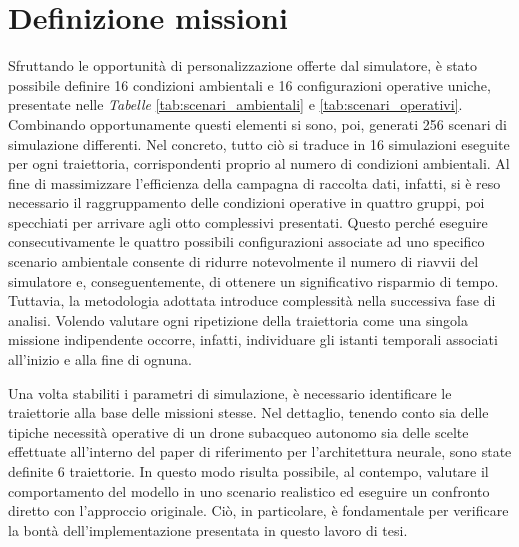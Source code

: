 \section{Definizione missioni}

Sfruttando le opportunità di personalizzazione offerte dal simulatore, è stato possibile definire 16 condizioni ambientali e 16 configurazioni operative uniche, presentate nelle \emph{Tabelle} \ref{tab:scenari_ambientali} e \ref{tab:scenari_operativi}. Combinando opportunamente questi elementi si sono, poi, generati 256 scenari di simulazione differenti. Nel concreto, tutto ciò si traduce in 16 simulazioni eseguite per ogni traiettoria, corrispondenti proprio al numero di condizioni ambientali. Al fine di massimizzare l'efficienza della campagna di raccolta dati, infatti, si è reso necessario il raggruppamento delle condizioni operative in quattro gruppi, poi specchiati per arrivare agli otto complessivi presentati. Questo perché eseguire consecutivamente le quattro possibili configurazioni associate ad uno specifico scenario ambientale consente di ridurre notevolmente il numero di riavvii del simulatore e, conseguentemente, di ottenere un significativo risparmio di tempo. Tuttavia, la metodologia adottata introduce complessità nella successiva fase di analisi. Volendo valutare ogni ripetizione della traiettoria come una singola missione indipendente occorre, infatti, individuare gli istanti temporali associati all'inizio e alla fine di ognuna.  

Una volta stabiliti i parametri di simulazione, è necessario identificare le traiettorie alla base delle missioni stesse. Nel dettaglio, tenendo conto sia delle tipiche necessità operative di un drone subacqueo autonomo sia delle scelte effettuate all'interno del paper di riferimento per l'architettura neurale\cite{NavNet}, sono state definite 6 traiettorie. In questo modo risulta possibile, al contempo, valutare il comportamento del modello in uno scenario realistico ed eseguire un confronto diretto con l'approccio originale. Ciò, in particolare, è fondamentale per verificare la bontà dell'implementazione presentata in questo lavoro di tesi.

